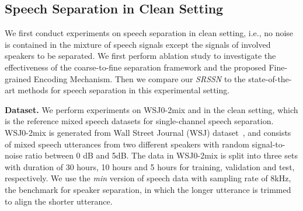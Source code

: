 \subsection{Speech Separation in Clean Setting}
\label{ssec:sep_clean}
We first conduct experiments on speech separation in clean setting, i.e., no noise is contained in the mixture of speech signals except the signals of involved speakers to be separated. We first perform ablation study to investigate the effectiveness of the coarse-to-fine separation framework and the proposed Fine-grained Encoding Mechanism. Then we compare our \emph{SRSSN} to the state-of-the-art methods for speech separation in this experimental setting.

\noindent\textbf{Dataset.} 
We perform experiments on WSJ0-2mix and  in the clean setting, which is the reference mixed speech datasets for single-channel speech separation. WSJ0-2mix is generated from Wall Street Journal (WSJ) dataset~\cite{wsj0}, and consists of mixed speech utterances from two different speakers with random signal-to-noise ratio between 0 dB and 5dB. The data in WSJ0-2mix is split into three sets with duration of 30 hours, 10 hours and 5 hours for training, validation and test, respectively. 
We use the \textit{min} version of speech data with sampling rate of 8kHz, the benchmark for speaker separation, in which the longer utterance is trimmed to align the shorter utterance.

\begin{comment}
\begin{figure}[b]
\begin{minipage}[b]{0.43\linewidth}
    \centering
    \centerline{\texttt{[image: bar\_SI-SNR]}}
    \centerline{(a) Performance in SI-SNRi.}\medskip
  \end{minipage}
  \hspace{0.02\linewidth}
  \begin{minipage}[b]{0.43\linewidth}
    \centering
    \centerline{\texttt{[image: bar\_SDR]}}
    \centerline{(b) Performance in SDRi.}\medskip
  \end{minipage}
\caption{Performance of four variants of our SRSSN in terms of SI-SNRi and SDRi for ablation study. $R$ is the number of DPRNN blocks in both coarse and refining separators.}
\label{fig:ablation}
\end{figure}
\end{comment}







